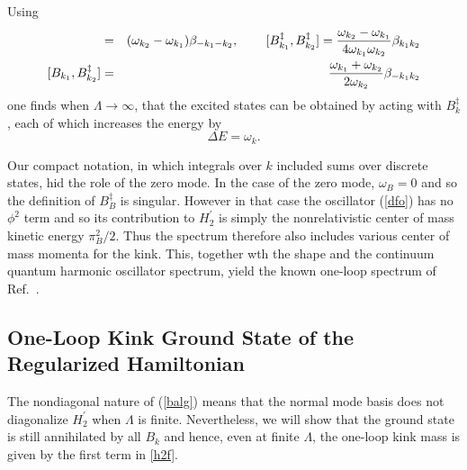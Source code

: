 \def\letter{0}\def\pr{0}\documentclass[a4paper,12pt, epsfig]{article}
\def\hsp{,\hspace{.7cm}}
\newcommand{\vac}{\ensuremath{|0\rangle}}
\renewcommand{\(}{\begin{equation}}
\renewcommand{\)}{end{equation} \vspace{-.05in}\linebreak}
\renewcommand{\=}{\hspace{-.03in}=\hspace{-.02in}}
\renewcommand{\(}{\begin{equation}}
\renewcommand{\)}{\end{equation}}
\renewcommand{\hsp}{,\hspace{.3in}}
\newcommand{\p}{^\prime}
\renewcommand{\(}{\begin{equation}}
\renewcommand{\)}{\end{equation}}
\def\pin#1{\int \frac{d#1}{2\pi}}
\newcommand{\beq}{\begin{equation}}
\newcommand{\eeq}{\end{equation}}
\newcommand{\bea}{\begin{eqnarray}}
\newcommand{\eea}{\end{eqnarray}}
\begin{document}
Using
\bea
[B_{k_1},B_{k_2}]&=&(\omega_{k_2}-\omega_{k_1})\beta_{-k_1-k_2}\hsp
[B^\ddag_{k_1},B^\ddag_{k_2}]=\frac{\omega_{k_2}-\omega_{k_1}}{4\omega_{k_1}\omega_{k_2}}\beta_{k_1k_2}
\nonumber\\
{[B_{k_1},B^\ddag_{k_2}]}
&=&\frac{\omega_{k_1}+\omega_{k_2}}{2\omega_{k_2}}\beta_{-k_1k_2} \label{balg}
\eea
one finds
when $\Lambda\rightarrow\infty$, that
the excited states can be obtained by acting with $B^\ddag_k$, each of which increases the energy by
\beq
\Delta E=\omega_k.
\eeq

Our compact notation, in which integrals over $k$ included sums over discrete states, hid the role of the zero mode.  In the case of the zero mode, $\omega_B=0$ and so the definition of $B^\ddag_B$ is singular.  However in that case the oscillator (\ref{dfo}) has no $\phi^2$ term and so its contribution to $H\p_2$ is simply the nonrelativistic center of mass kinetic energy $\pi^2_B/2$.  Thus the spectrum therefore also includes various center of mass momenta for the kink.  This, together wth the shape and the continuum quantum harmonic oscillator spectrum, yield the known one-loop spectrum of Ref.~\cite{dhn2}.

\subsection{One-Loop Kink Ground State of the Regularized Hamiltonian}

The nondiagonal nature of (\ref{balg}) means that the normal mode basis does not diagonalize $H\p_2$ when $\Lambda$ is finite.  Nevertheless, we will show that the ground state is still annihilated by all $B_{k}$ and hence, even at finite $\Lambda$, the one-loop kink mass is given by the first term in \eqref{h2f}.
\end{document}
